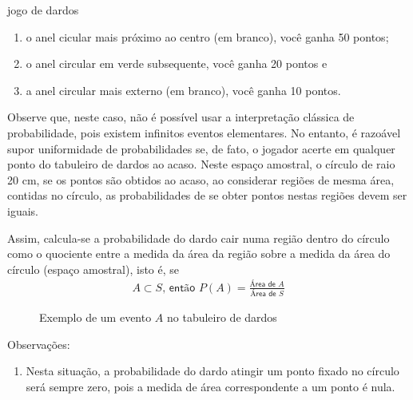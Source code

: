 \begin{task}{jogo de dardos}
\begin{enumerate}
\item {} 
o anel cicular mais próximo ao centro (em branco), você ganha 50 pontos;

\item {} 
o anel circular em verde subsequente, você ganha 20 pontos e

\item {} 
a anel circular mais externo (em branco), você ganha 10 pontos.

\end{enumerate}


Observe que, neste caso, não é possível usar a interpretação clássica de probabilidade, pois existem infinitos eventos elementares. No entanto, é razoável supor uniformidade de probabilidades se, de fato, o jogador acerte em qualquer ponto do tabuleiro de dardos ao acaso.  Neste espaço amostral, o círculo de raio 20 cm, se os pontos são obtidos ao acaso, ao considerar regiões de mesma área, contidas no círculo, as probabilidades de se obter pontos nestas regiões devem ser iguais.

Assim, calcula-se a probabilidade do dardo cair numa região dentro do círculo como o quociente entre a medida da área da região sobre a medida da área do círculo (espaço amostral), isto é, se
\begin{equation*}
\begin{split}A\subset S \textsf{, então } P(A)=\displaystyle{\frac{\textsf{Área de }A}{\textsf{Área de }S}}\end{split}
\end{equation*}

\begin{figure}[H]
\centering



\caption{Exemplo de um evento \(A\) no tabuleiro de dardos}
\end{figure}

Observações:
\begin{enumerate}
\item {} 
Nesta situação, a probabilidade do dardo atingir um ponto fixado no círculo será sempre zero, pois a medida de área correspondente a um ponto é nula.


\end{enumerate}
\end{task}
